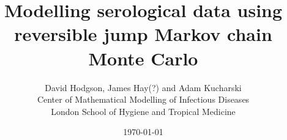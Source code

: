 \documentclass{article}
\title{Modelling serological data using reversible jump Markov chain Monte Carlo}
\author{David Hodgson, James Hay(?) and Adam Kucharski\\\small Center of Mathematical Modelling of Infectious Diseases\\\small London School of Hygiene and Tropical Medicine}
\date{\today}
\numberwithin{equation}{section}
\numberwithin{table}{section}
\begin{document}
\maketitle


\newpage

\newpage

\newpage

\newpage

 
\newpage
\newpage

\begin{appendices}





\end{appendices}

\newpage

\end{document}
